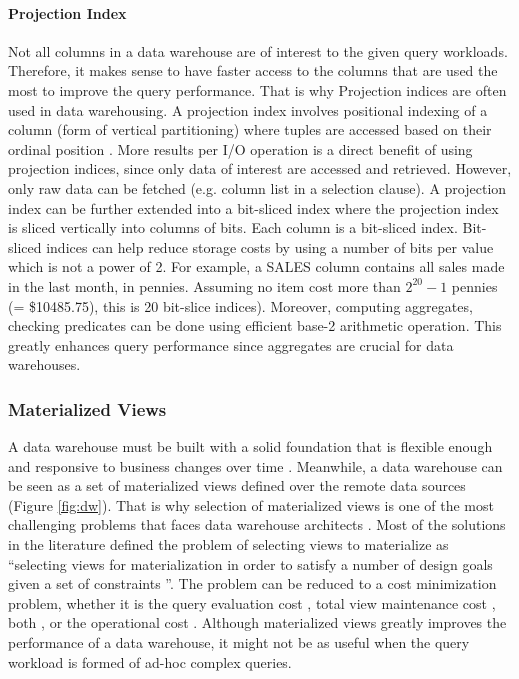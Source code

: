 \documentclass[12pt,a4paper]{article}
\begin{document}
\paragraph{Projection Index}
Not all columns in a data warehouse are of interest to the given query workloads. Therefore, it makes sense to have faster access to the columns that are used
the most to improve the query performance. That is why Projection indices are often used in data warehousing. A projection index involves positional indexing
of a column (form of vertical partitioning) where tuples are accessed based on their ordinal position \cite{datta2002parallel}. More results per I/O operation
is a direct benefit of using projection indices, since only data of interest are accessed and retrieved. However, only raw data can be fetched (e.g. column
list in a selection clause). A projection index can be further extended into a bit-sliced index \cite{oneil1997improved} where the projection index is sliced
vertically into columns of bits. Each column is a bit-sliced index. Bit-sliced indices can help reduce storage costs by using a number of bits per value which
is not a power of 2. For example, a SALES column contains all sales made in the last month, in pennies. Assuming no item cost more than $2^{20} - 1$ pennies (=
\$10485.75), this is 20 bit-slice indices). Moreover, computing aggregates, checking predicates can be done using efficient base-2 arithmetic operation. This
greatly enhances query performance since aggregates are crucial for data warehouses.

\subsubsection{Materialized Views}
A data warehouse must be built with a solid foundation that is flexible enough and responsive to business changes over time \cite{armstrong1997data}. Meanwhile,
a data warehouse can be seen as a set of materialized views defined over the remote data sources (Figure \ref{fig:dw}). That is why selection of materialized
views is one of the most challenging problems that faces data warehouse architects \cite{theodoratos2000general}. Most of the solutions in the literature
defined the problem of selecting views to materialize as \textquotedblleft selecting views for materialization in order to satisfy a number of design goals
given a set of constraints \textquotedblright. The problem can be reduced to a cost minimization problem, whether it is the query evaluation cost
\cite{harinarayan1996implementing}, total view maintenance cost \cite{kenneth1996materialized}, both \cite{yang1997algorithms}, or the operational cost
\cite{elena1997materialized, gupta2005selection, theodoratos1999designing, theodoratos1997data, theodoratos1999designingdw, theodoratos2000incremental,
yang1997algorithms}. Although materialized views greatly improves the performance of a data warehouse, it might not be as useful when the query workload is
formed of ad-hoc complex queries.
\end{document}
